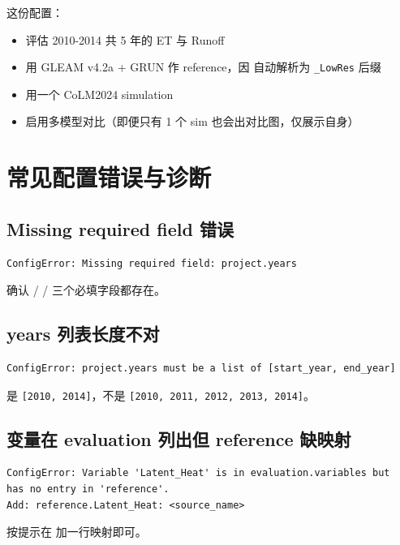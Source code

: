 这份配置：
\begin{itemize}
  \item 评估 2010-2014 共 5 年的 ET 与 Runoff
  \item 用 GLEAM v4.2a + GRUN 作 reference，因  自动解析为 \texttt{\_LowRes} 后缀
  \item 用一个 CoLM2024 simulation
  \item 启用多模型对比（即便只有 1 个 sim 也会出对比图，仅展示自身）
\end{itemize}

\section{常见配置错误与诊断}

\subsection{Missing required field 错误}

\begin{verbatim}
ConfigError: Missing required field: project.years
\end{verbatim}

确认  /  /  三个必填字段都存在。

\subsection{years 列表长度不对}

\begin{verbatim}
ConfigError: project.years must be a list of [start_year, end_year]
\end{verbatim}

 是 \texttt{[2010, 2014]}，不是 \texttt{[2010, 2011, 2012, 2013, 2014]}。

\subsection{变量在 evaluation 列出但 reference 缺映射}

\begin{verbatim}
ConfigError: Variable 'Latent_Heat' is in evaluation.variables but
has no entry in 'reference'.
Add: reference.Latent_Heat: <source_name>
\end{verbatim}

按提示在  加一行映射即可。

